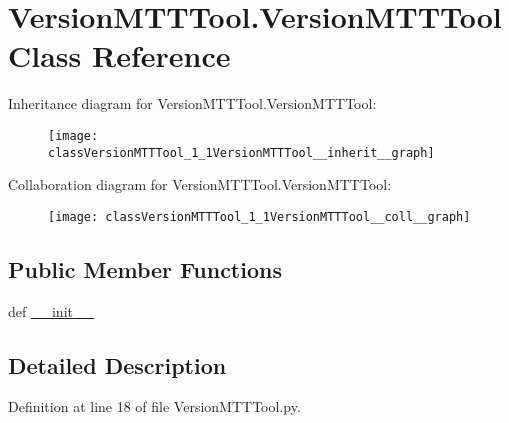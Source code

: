 \hypertarget{classVersionMTTTool_1_1VersionMTTTool}{\section{Version\-M\-T\-T\-Tool.\-Version\-M\-T\-T\-Tool Class Reference}
\label{classVersionMTTTool_1_1VersionMTTTool}
}


Inheritance diagram for Version\-M\-T\-T\-Tool.\-Version\-M\-T\-T\-Tool\-:\nopagebreak
\begin{figure}[H]
\begin{center}
\leavevmode
\texttt{[image: classVersionMTTTool\_1\_1VersionMTTTool\_\_inherit\_\_graph]}
\end{center}
\end{figure}


Collaboration diagram for Version\-M\-T\-T\-Tool.\-Version\-M\-T\-T\-Tool\-:\nopagebreak
\begin{figure}[H]
\begin{center}
\leavevmode
\texttt{[image: classVersionMTTTool\_1\_1VersionMTTTool\_\_coll\_\_graph]}
\end{center}
\end{figure}
\subsection*{Public Member Functions}
\begin{DoxyCompactItemize}
\item 
def \hyperlink{classVersionMTTTool_1_1VersionMTTTool_ad38377896d6a4d616f83f28ba2c0b388}{\-\_\-\-\_\-init\-\_\-\-\_\-}
\end{DoxyCompactItemize}


\subsection{Detailed Description}


Definition at line 18 of file Version\-M\-T\-T\-Tool.\-py.



